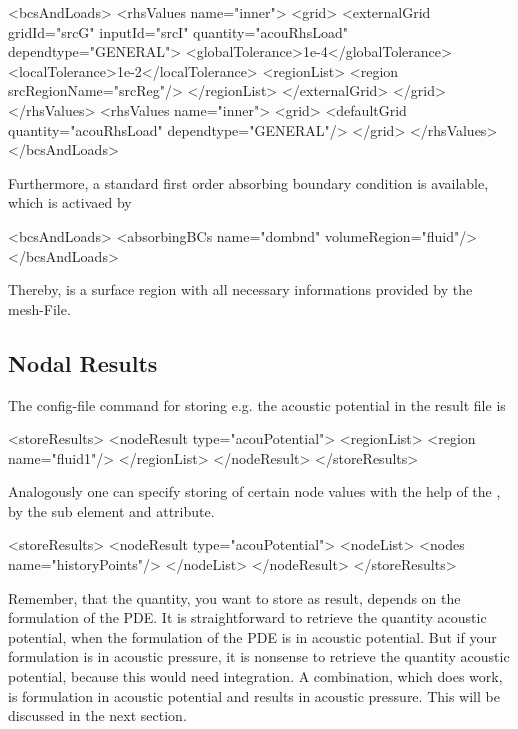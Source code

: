 \begin{xmllisting} 
<bcsAndLoads>
  <rhsValues name="inner">
     <grid>
        <externalGrid gridId="srcG" inputId="srcI" 
             quantity="acouRhsLoad" dependtype="GENERAL">
          <globalTolerance>1e-4</globalTolerance>
           <localTolerance>1e-2</localTolerance>
           <regionList>
              <region srcRegionName="srcReg"/>
           </regionList>
        </externalGrid>
     </grid>
  </rhsValues>
  <rhsValues name="inner">
     <grid>
        <defaultGrid quantity="acouRhsLoad" dependtype="GENERAL"/>
     </grid>
  </rhsValues>
</bcsAndLoads>
\end{xmllisting}


Furthermore, a standard first order absorbing boundary condition is
available, which is activaed by

\begin{xmllisting} 
<bcsAndLoads>
    <absorbingBCs name="dombnd" volumeRegion="fluid"/>
</bcsAndLoads>
\end{xmllisting}

\noindent
Thereby,  is a surface region with all necessary
informations provided by the mesh-File.

\subsection{Nodal Results}
The config-file command for storing e.g. the acoustic potential in the result
file is

\begin{xmllisting}      
<storeResults>
   <nodeResult type="acouPotential">
      <regionList>
        <region name="fluid1"/>
      </regionList>
   </nodeResult> 
</storeResults>
\end{xmllisting}

Analogously one can specify storing of certain node values with the help of the
, by the sub element  and 
attribute. 

\begin{xmllisting}    
<storeResults>
  <nodeResult type="acouPotential">
    <nodeList>
     <nodes name="historyPoints"/>
    </nodeList>
  </nodeResult> 
</storeResults>
\end{xmllisting}

Remember, that the quantity, you want to store as result, depends on the
formulation of the PDE. It is straightforward to retrieve the quantity acoustic
potential, when the formulation of the PDE is in acoustic potential. But if your
formulation is in acoustic pressure, it is nonsense to retrieve the quantity
acoustic potential, because this would need integration. A combination, which
does work, is formulation in acoustic potential and results in acoustic
pressure. This will be discussed in the next section.

